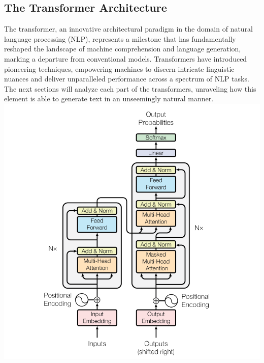 \documentclass[a4paper,12pt]{article}
\begin{document}
\subsection{The Transformer Architecture}
The transformer, an innovative architectural paradigm in the domain of natural language processing (NLP), 
represents a milestone that has fundamentally reshaped the landscape of machine comprehension and language generation, 
marking a departure from conventional models. Transformers have introduced pioneering techniques, empowering machines to discern 
intricate linguistic nuances and deliver unparalleled performance across a spectrum of NLP tasks. The next sections will analyze 
each part of the transformers, unraveling how this element is able to generate text in an unseemingly natural manner.
\includegraphics[width=\linewidth]{Imm/transformer_architecture.PNG}
\end{document}
